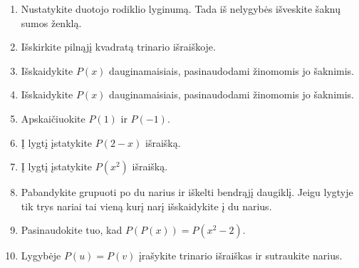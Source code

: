 \documentclass[11pt,a4paper]{scrartcl}
\begin{document}
\begin{enumerate}
    $\frac{\pi}{m}$.
    \item Nustatykite duotojo rodiklio lyginumą. Tada iš nelygybės
    išveskite šaknų sumos ženklą.
    \item Išskirkite pilnąjį kvadratą trinario išraiškoje.
    \item Išskaidykite $P(x)$ dauginamaisiais, pasinaudodami žinomomis jo šaknimis.
    \item Išskaidykite $P(x)$ dauginamaisiais, pasinaudodami žinomomis jo šaknimis.
    \item Apskaičiuokite $P(1)$ ir $P(-1)$.
    \item Į lygtį įstatykite $P(2-x)$ išraišką.
    \item Į lygtį įstatykite $P(x^2)$ išraišką.
    \item Pabandykite grupuoti po du narius ir iškelti bendrąjį
    daugiklį. Jeigu lygtyje tik trys nariai tai vieną kurį narį išskaidykite į du narius.
    \item Pasinaudokite tuo, kad $P(P(x))=P(x^2-2)$.
    \item Lygybėje $P(u)=P(v)$ įrašykite trinario išraiškas ir
    sutraukite narius.
\end{enumerate}
\end{document}
